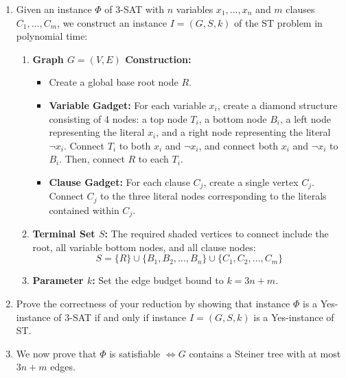 \documentclass[12pt,a4paper]{article}
\makeatletter
\newtheorem*{solution}{Solution}
\theoremstyle{definition}
\renewenvironment{solution}[1][Solution] {\par\pushQED{\qed}\normalfont\topsep6\p@\@plus6\p@\relax\trivlist\item[\hskip\labelsep\bfseries#1\@addpunct{.}]\ignorespaces}{\popQED\endtrivlist\@endpefalse} \makeatother
\makeatother
\begin{document}
\begin{enumerate}
\begin{enumerate}
        \begin{solution}
        Given an instance $\Phi$ of 3-SAT with $n$ variables $x_1, \dots, x_n$ and $m$ clauses $C_1, \dots, C_m$, we construct an instance $I = (G, S, k)$ of the ST problem in polynomial time:
        \begin{enumerate}
            \item \textbf{Graph $G = (V, E)$ Construction:}
            \begin{itemize}
                \item Create a global base root node $R$.
                \item \textbf{Variable Gadget:} For each variable $x_i$, create a diamond structure consisting of 4 nodes: a top node $T_i$, a bottom node $B_i$, a left node representing the literal $x_i$, and a right node representing the literal $\neg x_i$. Connect $T_i$ to both $x_i$ and $\neg x_i$, and connect both $x_i$ and $\neg x_i$ to $B_i$. Then, connect $R$ to each $T_i$.
                \item \textbf{Clause Gadget:} For each clause $C_j$, create a single vertex $C_j$. Connect $C_j$ to the three literal nodes corresponding to the literals contained within $C_j$.
            \end{itemize}
            \item \textbf{Terminal Set $S$:} The required shaded vertices to connect include the root, all variable bottom nodes, and all clause nodes:
            \[
            S = \{R\} \cup \{B_1, B_2, \dots, B_n\} \cup \{C_1, C_2, \dots, C_m\}
            \]
            \item \textbf{Parameter $k$:} Set the edge budget bound to $k = 3n + m$.
        \end{enumerate}
        \end{solution}
        
        \item Prove the correctness of your reduction by showing that instance $\Phi$ is a Yes-instance of 3-SAT if and only if instance $I = (G, S, k)$ is a Yes-instance of ST.
        
        \begin{solution}
        We now prove that $\Phi$ is satisfiable $\iff G$ contains a Steiner tree with at most $3n + m$ edges.
        

\end{solution}
\end{enumerate}
\end{enumerate}
\end{document}

